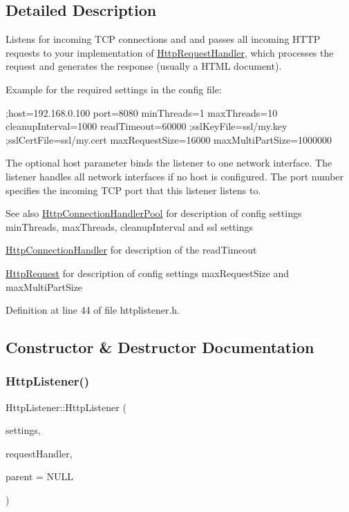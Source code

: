 \subsection{Detailed Description}
Listens for incoming T\+CP connections and and passes all incoming H\+T\+TP requests to your implementation of \mbox{\hyperlink{classstefanfrings_1_1_http_request_handler}{Http\+Request\+Handler}}, which processes the request and generates the response (usually a H\+T\+ML document). 

Example for the required settings in the config file\+: {\ttfamily 
\begin{DoxyPre}
;host=192.168.0.100
port=8080
minThreads=1
maxThreads=10
cleanupInterval=1000
readTimeout=60000
;sslKeyFile=ssl/my.key
;sslCertFile=ssl/my.cert
maxRequestSize=16000
maxMultiPartSize=1000000
\end{DoxyPre}
} The optional host parameter binds the listener to one network interface. The listener handles all network interfaces if no host is configured. The port number specifies the incoming T\+CP port that this listener listens to. \begin{DoxySeeAlso}{See also}
\mbox{\hyperlink{classstefanfrings_1_1_http_connection_handler_pool}{Http\+Connection\+Handler\+Pool}} for description of config settings min\+Threads, max\+Threads, cleanup\+Interval and ssl settings 

\mbox{\hyperlink{classstefanfrings_1_1_http_connection_handler}{Http\+Connection\+Handler}} for description of the read\+Timeout 

\mbox{\hyperlink{classstefanfrings_1_1_http_request}{Http\+Request}} for description of config settings max\+Request\+Size and max\+Multi\+Part\+Size 
\end{DoxySeeAlso}


Definition at line 44 of file httplistener.\+h.



\subsection{Constructor \& Destructor Documentation}
\mbox{\label{classstefanfrings_1_1_http_listener_a5ef569cd134e6bd457db70bc1fc01ef2}} 
\subsubsection{\texorpdfstring{Http\+Listener()}{HttpListener()}}
{\footnotesize\ttfamily Http\+Listener\+::\+Http\+Listener (\begin{DoxyParamCaption}\item[{Q\+Settings $\ast$}]{settings,  }\item[{\mbox{\hyperlink{classstefanfrings_1_1_http_request_handler}{Http\+Request\+Handler}} $\ast$}]{request\+Handler,  }\item[{Q\+Object $\ast$}]{parent = {\ttfamily NULL} }\end{DoxyParamCaption})}

